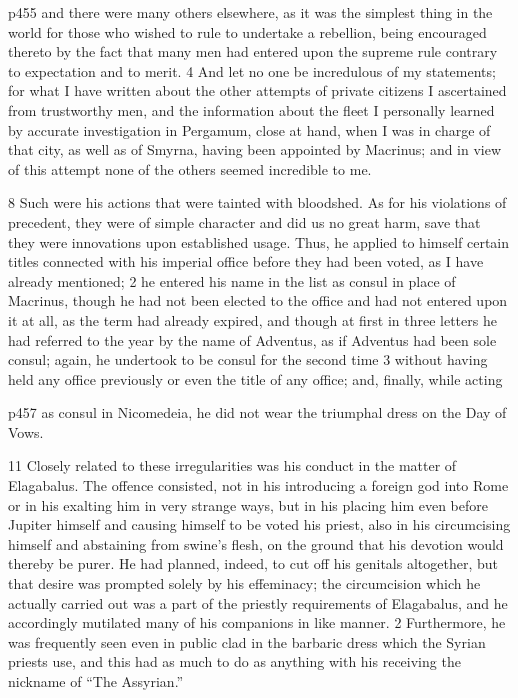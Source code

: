 p455 and there were many others elsewhere, as it was the simplest thing in the world for those who wished to rule to undertake a rebellion, being encouraged thereto by the fact that many men had entered upon the supreme rule contrary to expectation and to merit. 4 And let no one be incredulous of my statements; for what I have written about the other attempts of private citizens I ascertained from trustworthy men, and the information about the fleet I personally learned by accurate investigation in Pergamum, close at hand, when I was in charge of that city, as well as of Smyrna, having been appointed by Macrinus; and in view of this attempt none of the others seemed incredible to me.

8
Such were his actions that were tainted with bloodshed. As for his violations of precedent, they were of simple character and did us no great harm, save that they were innovations upon established usage. Thus, he applied to himself certain titles connected with his imperial office before they had been voted, as I have already mentioned; 2 he entered his name in the list as consul in place of Macrinus, though he had not been elected to the office and had not entered upon it at all, as the term had already expired, and though at first in three letters he had referred to the year by the name of Adventus, as if Adventus had been sole consul; again, he undertook to be consul for the second time 3 without having held any office previously or even the title of any office; and, finally, while acting

p457 as consul in Nicomedeia, he did not wear the triumphal dress on the Day of Vows.

11
Closely related to these irregularities was his conduct in the matter of Elagabalus. The offence consisted, not in his introdu­cing a foreign god into Rome or in his exalting him in very strange ways, but in his pla­cing him even before Jupiter himself and causing himself to be voted his priest, also in his circumcising himself and abstaining from swine's flesh, on the ground that his devotion would thereby be purer. He had planned, indeed, to cut off his genitals altogether, but that desire was prompted solely by his effeminacy; the circumcision which he actually carried out was a part of the priestly requirements of Elagabalus, and he accordingly mutilated many of his companions in like manner. 2 Furthermore, he was frequently seen even in public clad in the barbaric dress which the Syrian priests use, and this had as much to do as anything with his receiving the nickname of ``The Assyrian.''

